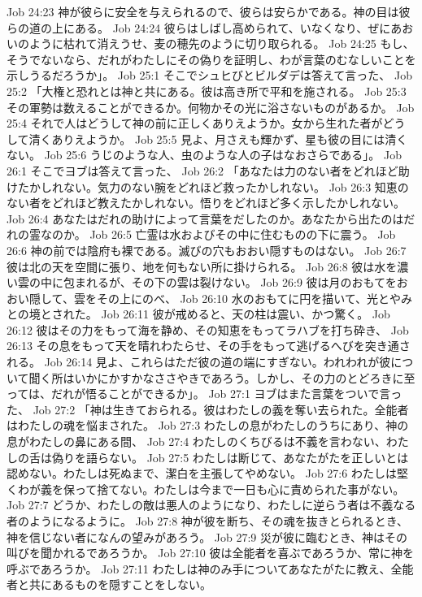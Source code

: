 Job 24:23  神が彼らに安全を与えられるので、彼らは安らかである。神の目は彼らの道の上にある。
Job 24:24  彼らはしばし高められて、いなくなり、ぜにあおいのように枯れて消えうせ、麦の穂先のように切り取られる。
Job 24:25  もし、そうでないなら、だれがわたしにその偽りを証明し、わが言葉のむなしいことを示しうるだろうか」。
Job 25:1  そこでシュヒびとビルダデは答えて言った、
Job 25:2  「大権と恐れとは神と共にある。彼は高き所で平和を施される。
Job 25:3  その軍勢は数えることができるか。何物かその光に浴さないものがあるか。
Job 25:4  それで人はどうして神の前に正しくありえようか。女から生れた者がどうして清くありえようか。
Job 25:5  見よ、月さえも輝かず、星も彼の目には清くない。
Job 25:6  うじのような人、虫のような人の子はなおさらである」。
Job 26:1  そこでヨブは答えて言った、
Job 26:2  「あなたは力のない者をどれほど助けたかしれない。気力のない腕をどれほど救ったかしれない。
Job 26:3  知恵のない者をどれほど教えたかしれない。悟りをどれほど多く示したかしれない。
Job 26:4  あなたはだれの助けによって言葉をだしたのか。あなたから出たのはだれの霊なのか。
Job 26:5  亡霊は水およびその中に住むものの下に震う。
Job 26:6  神の前では陰府も裸である。滅びの穴もおおい隠すものはない。
Job 26:7  彼は北の天を空間に張り、地を何もない所に掛けられる。
Job 26:8  彼は水を濃い雲の中に包まれるが、その下の雲は裂けない。
Job 26:9  彼は月のおもてをおおい隠して、雲をその上にのべ、
Job 26:10  水のおもてに円を描いて、光とやみとの境とされた。
Job 26:11  彼が戒めると、天の柱は震い、かつ驚く。
Job 26:12  彼はその力をもって海を静め、その知恵をもってラハブを打ち砕き、
Job 26:13  その息をもって天を晴れわたらせ、その手をもって逃げるへびを突き通される。
Job 26:14  見よ、これらはただ彼の道の端にすぎない。われわれが彼について聞く所はいかにかすかなささやきであろう。しかし、その力のとどろきに至っては、だれが悟ることができるか」。
Job 27:1  ヨブはまた言葉をついで言った、
Job 27:2  「神は生きておられる。彼はわたしの義を奪い去られた。全能者はわたしの魂を悩まされた。
Job 27:3  わたしの息がわたしのうちにあり、神の息がわたしの鼻にある間、
Job 27:4  わたしのくちびるは不義を言わない、わたしの舌は偽りを語らない。
Job 27:5  わたしは断じて、あなたがたを正しいとは認めない。わたしは死ぬまで、潔白を主張してやめない。
Job 27:6  わたしは堅くわが義を保って捨てない。わたしは今まで一日も心に責められた事がない。
Job 27:7  どうか、わたしの敵は悪人のようになり、わたしに逆らう者は不義なる者のようになるように。
Job 27:8  神が彼を断ち、その魂を抜きとられるとき、神を信じない者になんの望みがあろう。
Job 27:9  災が彼に臨むとき、神はその叫びを聞かれるであろうか。
Job 27:10  彼は全能者を喜ぶであろうか、常に神を呼ぶであろうか。
Job 27:11  わたしは神のみ手についてあなたがたに教え、全能者と共にあるものを隠すことをしない。
